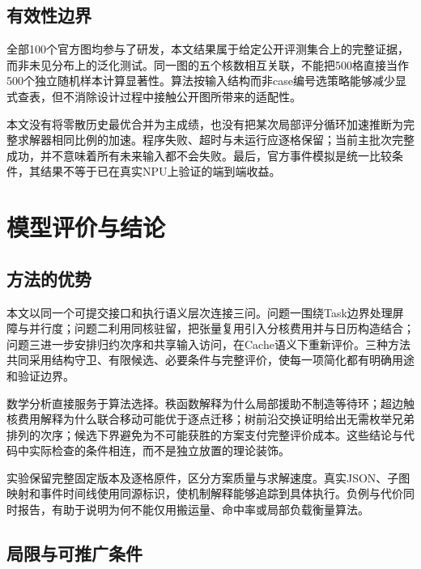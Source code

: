 \documentclass[anonymous,notoc]{gmcm2026}
\begin{document}
\subsection{有效性边界}\label{ux6709ux6548ux6027ux8fb9ux754c}

全部100个官方图均参与了研发，本文结果属于给定公开评测集合上的完整证据，而非未见分布上的泛化测试。同一图的五个核数相互关联，不能把500格直接当作500个独立随机样本计算显著性。算法按输入结构而非case编号选策略能够减少显式查表，但不消除设计过程中接触公开图所带来的适配性。

本文没有将零散历史最优合并为主成绩，也没有把某次局部评分循环加速推断为完整求解器相同比例的加速。程序失败、超时与未运行应逐格保留；当前主批次完整成功，并不意味着所有未来输入都不会失败。最后，官方事件模拟是统一比较条件，其结果不等于已在真实NPU上验证的端到端收益。

\FloatBarrier

\section{模型评价与结论}\label{ux6a21ux578bux8bc4ux4ef7ux4e0eux7ed3ux8bba}

\subsection{方法的优势}\label{ux65b9ux6cd5ux7684ux4f18ux52bf}

本文以同一个可提交接口和执行语义层次连接三问。问题一围绕Task边界处理屏障与并行度；问题二利用同核驻留，把张量复用引入分核费用并与日历构造结合；问题三进一步安排归约次序和共享输入访问，在Cache语义下重新评价。三种方法共同采用结构守卫、有限候选、必要条件与完整评价，使每一项简化都有明确用途和验证边界。

数学分析直接服务于算法选择。秩函数解释为什么局部援助不制造等待环；超边触核费用解释为什么联合移动可能优于逐点迁移；树前沿交换证明给出无需枚举兄弟排列的次序；候选下界避免为不可能获胜的方案支付完整评价成本。这些结论与代码中实际检查的条件相连，而不是独立放置的理论装饰。

实验保留完整固定版本及逐格原件，区分方案质量与求解速度。真实JSON、子图映射和事件时间线使用同源标识，使机制解释能够追踪到具体执行。负例与代价同时报告，有助于说明为何不能仅用搬运量、命中率或局部负载衡量算法。

\subsection{局限与可推广条件}\label{ux5c40ux9650ux4e0eux53efux63a8ux5e7fux6761ux4ef6}
\end{document}
